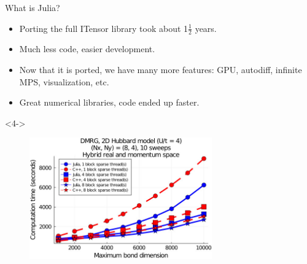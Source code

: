 \begin{frame}{What is Julia?}

\begin{itemize}[<+->]

  \item Porting the full ITensor library took about 1$\frac{1}{2}$ years.
  \item Much less code, easier development.
  \item Now that it is ported, we have many more features: GPU, autodiff, infinite MPS, visualization, etc.
  \item Great numerical libraries, code ended up faster.

\end{itemize}

\begin{onlyenv}<4->

\begin{figure}[T]
  \includegraphics[width=0.7\textwidth]{
    slides/assets/what-is-julia-itensor-benchmark.jpg
  }
\end{figure}

\end{onlyenv}

\end{frame}
